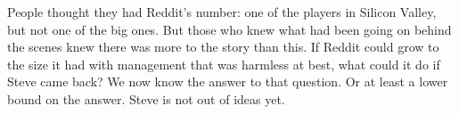 People
                  thought they had Reddit's number: one of the players in
                  Silicon Valley, but not one of the big ones. But those who
                  knew what had been going on behind the scenes knew there was
                  more to the story than this. If Reddit could grow to the size
                  it had with management that was harmless at best, what could
                  it do if Steve came back? We now know the answer to that
                  question. Or at least a lower bound on the answer. Steve is
                  not out of ideas yet.




              
            
          
            
              
                


                  
              
            
          
